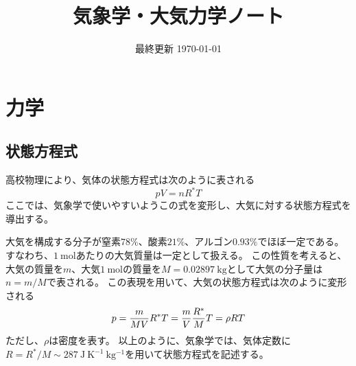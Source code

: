 \documentclass[a4paper,11pt,platex]{jsarticle}
\title{気象学・大気力学ノート}
\date{最終更新 \today}
\numberwithin{equation}{section}
\newcommand{\nse}{Navier-Stokes方程式}
\begin{document}
\maketitle

\clearpage
\tableofcontents
\clearpage
{}



\section{力学}


\subsection{状態方程式}
高校物理により、気体の状態方程式は次のように表される
\begin{equation}
    pV = nR^*T
\end{equation}
ここでは、気象学で使いやすいようこの式を変形し、大気に対する状態方程式を導出する。

大気を構成する分子が窒素$78\%$、酸素$21\%$、アルゴン$0.93\%$でほぼ一定である。
すなわち、$1 \: \mathrm{mol}$あたりの大気質量は一定として扱える。
この性質を考えると、大気の質量を$m$、大気$1 \: \mathrm{mol}$の質量を$M=0.02897 \:\mathrm{kg}$として大気の分子量は$n=m/M$で表される。
この表現を用いて、大気の状態方程式は次のように変形される
\begin{equation}
    \label{equation_of_state}
    p = {m \over MV} R^* T
      = {m \over V} {R^* \over M} T
      = \rho RT
\end{equation}
ただし、$\rho$は密度を表す。
以上のように、気象学では、気体定数に$R=R^*/M \sim 287 \: \mathrm{J \: K^{-1} \: kg^{-1}}$を用いて状態方程式を記述する。
\end{document}
